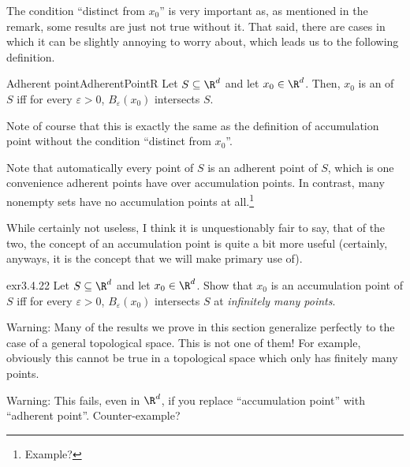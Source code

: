 The condition ``distinct from $x_0$'' is very important as, as mentioned in the remark, some results are just not true without it.  That said, there are cases in which it can be slightly annoying to worry about, which leads us to the following definition.
\begin{dfn}{Adherent point}{AdherentPointR}
Let $S\subseteq \R ^d$ and let $x_0\in \R ^d$.  Then, $x_0$ is an  of $S$ iff for every $\varepsilon >0$, $B_{\varepsilon}(x_0)$ intersects $S$.
\begin{rmk}
Note of course that this is exactly the same as the definition of accumulation point without the condition ``distinct from $x_0$''.
\end{rmk}
\begin{rmk}
Note that automatically every point of $S$ is an adherent point of $S$, which is one convenience adherent points have over accumulation points.  In contrast, many nonempty sets have no accumulation points at all.\footnote{Example?}
\end{rmk}
\begin{rmk}
While certainly not useless, I think it is unquestionably fair to say, that of the two, the concept of an accumulation point is quite a bit more useful (certainly, anyways, it is the concept that we will make primary use of).
\end{rmk}
\end{dfn}
\begin{exr}{}{exr3.4.22}
Let $S\subseteq \R ^d$ and let $x_0\in \R ^d$.  Show that $x_0$ is an accumulation point of $S$ iff for every $\varepsilon >0$, $B_\varepsilon (x_0)$ intersects $S$ at \emph{infinitely many points}.
\begin{wrn}
Warning:  Many of the results we prove in this section generalize perfectly to the case of a general topological space.  This is not one of them!  For example, obviously this cannot be true in a topological space which only has finitely many points.
\end{wrn}
\begin{wrn}
Warning:  This fails, even in $\R ^d$, if you replace ``accumulation point'' with ``adherent point''.  Counter-example?
\end{wrn}
\end{exr}
